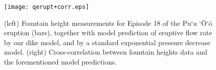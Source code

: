 \documentclass{article}
\begin{document}
\begin{figure}[h]
\begin{center}
\leavevmode
\texttt{[image: qerupt+corr.eps]}
\end{center}
\caption
{\label{qerupt}{\small (left) Fountain height measurements for Episode 18 of the Pu`u `\=O`\=o eruption (bars), together with model prediction of eruptive flow rate by our dike model, and by a standard exponential pressure decrease model. (right) Cross-correlation between fountain heights data and the forementioned model predictions.}}
\end{figure}
\end{document}
